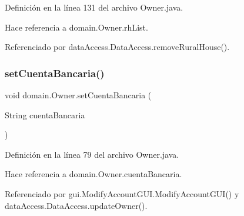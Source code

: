 Definición en la línea 131 del archivo Owner.\+java.


\begin{DoxyCode}{0}

\end{DoxyCode}


Hace referencia a domain.\+Owner.\+rh\+List.



Referenciado por data\+Access.\+Data\+Access.\+remove\+Rural\+House().

\mbox{\label{classdomain_1_1_owner_a585ddd63f0f59a3198fa98689b07635e}} 
\subsubsection{\texorpdfstring{setCuentaBancaria()}{setCuentaBancaria()}}
{\footnotesize\ttfamily void domain.\+Owner.\+set\+Cuenta\+Bancaria (\begin{DoxyParamCaption}\item[{String}]{cuenta\+Bancaria }\end{DoxyParamCaption})}



Definición en la línea 79 del archivo Owner.\+java.


\begin{DoxyCode}{0}

\end{DoxyCode}


Hace referencia a domain.\+Owner.\+cuenta\+Bancaria.



Referenciado por gui.\+Modify\+Account\+G\+U\+I.\+Modify\+Account\+G\+U\+I() y data\+Access.\+Data\+Access.\+update\+Owner().

\mbox{\label{classdomain_1_1_owner_a021c9e357ca913eb88688a7aaa3e298d}} 

